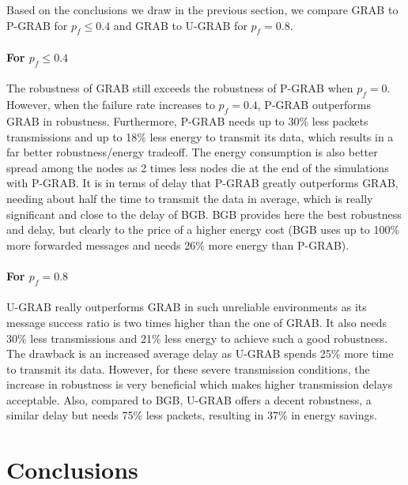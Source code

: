 \documentclass[journal, peerreview, onecolumn, draftcls]{IEEEtran}
\begin{document}
Based on the conclusions we draw in the previous section, we compare GRAB to P-GRAB for $p_f\leq0.4$ and GRAB to U-GRAB for $p_f=0.8$.

\paragraph{\rm For $p_f\leq0.4$}
The robustness of GRAB still exceeds the robustness of P-GRAB when $p_f=0$. However, when the failure rate increases to $p_f=0.4$, P-GRAB outperforms GRAB in robustness. Furthermore, P-GRAB needs up to 30\% less packets transmissions and up to 18\% less energy to transmit its data, which results in a far better robustness/energy tradeoff.
The energy consumption is also better spread among the nodes as 2 times less nodes die at the end of the simulations with P-GRAB.
It is in terms of delay that P-GRAB greatly outperforms GRAB, needing about half the time to transmit the data in average, which is really significant and close to the delay of BGB. BGB provides here the best robustness and delay, but clearly to the price of a higher energy cost (BGB uses up to 100\% more forwarded messages and needs 26\% more energy than P-GRAB).

\paragraph{\rm For $p_f=0.8$}
U-GRAB really outperforms GRAB in such unreliable environments as its message success ratio is two times higher than the one of GRAB. It also needs 30\% less transmissions and 21\% less energy to achieve such a good robustness. The drawback is an increased average delay as U-GRAB spends 25\% more time to transmit its data. However, for these severe transmission conditions, the increase in robustness is very beneficial which makes higher transmission delays acceptable. Also, compared to BGB, U-GRAB offers a decent robustness, a similar delay but needs 75\% less packets, resulting in 37\% in energy savings.

\section{Conclusions}
\end{document}
